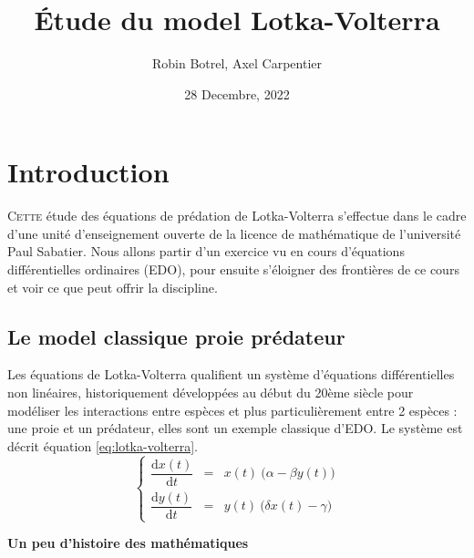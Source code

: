 \documentclass{wsdcr}
\title{Étude du model Lotka-Volterra}
\author{Robin Botrel, Axel Carpentier}
\affil{\textit{Université Paul Sabatier}\\
\textit{Toulouse, France}}
\date{28 Decembre, 2022}
\begin{document}
\maketitle
\tableofcontents
\section{Introduction}

\lettrine{C}{ette} étude des équations de prédation de Lotka-Volterra s'effectue dans le cadre d'une unité d'enseignement ouverte de la licence de mathématique de l'université Paul Sabatier. Nous allons partir d'un exercice vu en cours d'équations différentielles ordinaires (EDO), pour ensuite s'éloigner des frontières de ce cours et voir ce que peut offrir la discipline.


\subsection{Le model classique proie prédateur}

Les équations de Lotka-Volterra qualifient un système d'équations différentielles non linéaires, historiquement développées au début du 20ème siècle pour modéliser les interactions entre espèces et plus particulièrement entre 2 espèces : une proie et un prédateur, elles sont un exemple classique d'EDO. Le système est décrit équation \ref{eq:lotka-volterra}. \cite{lotka1920}
\begin{equation}
\left\{
{\begin{array}{ccc}{\dfrac {\mathrm {d} x(t)}{\mathrm {d} t}}&=&x(t)\ {\Big (}\alpha -\beta y(t){\Big )}\\{\dfrac {\mathrm {d} y(t)}{\mathrm {d} t}}&=&y(t)\ {\Big (}\delta x(t)-\gamma {\Big )}\end{array}}
\right.
\label{eq:lotka-volterra}
\end{equation}

\begin{center}
    \fontsize{10}{12}\selectfont
    \textbf{Un peu d'histoire des mathématiques}
\end{center}
\end{document}
